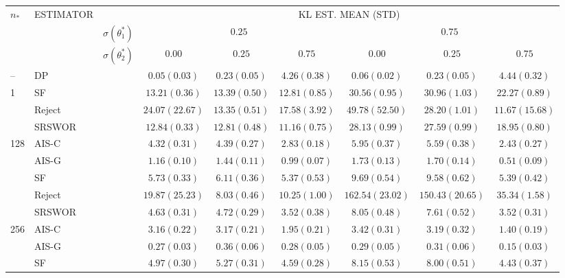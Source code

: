 
\begin{tabular}{lllccc|ccc}
\toprule
\multirow{3}{*}{$n_*$} & \multirow{3}{*}{ESTIMATOR} && \multicolumn{6}{c}{KL EST. MEAN (STD)} \\
\cmidrule{4-9}
&&$\sigma(\theta^*_1)$& \multicolumn{3}{c|}{$0.25$} & \multicolumn{3}{c}{$0.75$} \\
&&$\sigma(\theta^*_2)$& $0.00$ & $0.25$ & $0.75$ & $0.00$ & $0.25$ & $0.75$ 
\\
\midrule
\multirow{1}{*}{--}  & DP     &  & $0.05(0.03)$   & $0.23(0.05)$   & $4.26(0.38)$   & $0.06(0.02)$   & $0.23(0.05)$   & $4.44(0.32)$   \\
\midrule
\multirow{3}{*}{1}   & SF     &  & $13.21(0.36)$  & $13.39(0.50)$  & $12.81(0.85)$  & $30.56(0.95)$  & $30.96(1.03)$  & $22.27(0.89)$  \\
                     & Reject &  & $24.07(22.67)$ & $13.35(0.51)$  & $17.58(3.92)$  & $49.78(52.50)$ & $28.20(1.01)$  & $11.67(15.68)$ \\
                     & SRSWOR &  & $12.84(0.33)$  & $12.81(0.48)$  & $11.16(0.75)$  & $28.13(0.99)$  & $27.59(0.99)$  & $18.95(0.80)$  \\
\midrule
\multirow{5}{*}{128} & AIS-C  &  & $4.32(0.31)$   & $4.39(0.27)$   & $2.83(0.18)$   & $5.95(0.37)$   & $5.59(0.38)$   & $2.43(0.27)$   \\
                     & AIS-G  &  & $1.16(0.10)$   & $1.44(0.11)$   & $0.99(0.07)$   & $1.73(0.13)$   & $1.70(0.14)$   & $0.51(0.09)$   \\
                     & SF     &  & $5.73(0.33)$   & $6.11(0.36)$   & $5.37(0.53)$   & $9.69(0.54)$   & $9.58(0.62)$   & $5.39(0.42)$   \\
                     & Reject &  & $19.87(25.23)$ & $8.03(0.46)$   & $10.25(1.00)$  & $162.54(23.02)$& $150.43(20.65)$& $35.34(1.58)$  \\
                     & SRSWOR &  & $4.63(0.31)$   & $4.72(0.29)$   & $3.52(0.38)$   & $8.05(0.48)$   & $7.61(0.52)$   & $3.52(0.31)$   \\
\midrule
\multirow{5}{*}{256} & AIS-C  &  & $3.16(0.22)$   & $3.17(0.21)$   & $1.95(0.21)$   & $3.42(0.31)$   & $3.19(0.32)$   & $1.40(0.19)$   \\
                     & AIS-G  &  & $0.27(0.03)$   & $0.36(0.06)$   & $0.28(0.05)$   & $0.29(0.05)$   & $0.31(0.06)$   & $0.15(0.03)$   \\
                     & SF     &  & $4.97(0.30)$   & $5.27(0.31)$   & $4.59(0.28)$   & $8.15(0.53)$   & $8.00(0.51)$   & $4.43(0.37)$   \\

\end{tabular}

